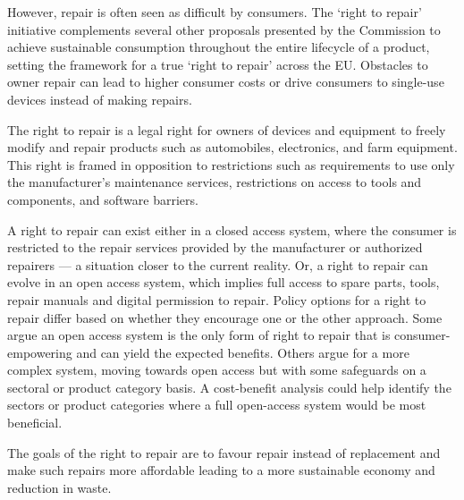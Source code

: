 However, repair is often seen as difficult by consumers. The `right to repair'
initiative complements several other proposals presented by the Commission to
achieve sustainable consumption throughout the entire lifecycle of a product,
setting the framework for a true `right to repair' across the EU. Obstacles to
owner repair can lead to higher consumer costs or drive consumers to single-use
devices instead of making repairs.

The right to repair is a legal right for owners of devices and equipment to
freely modify and repair products such as automobiles, electronics, and farm
equipment. This right is framed in opposition to restrictions such as
requirements to use only the manufacturer's maintenance services, restrictions
on access to tools and components, and software barriers.

A right to repair can exist either in a closed access system, where the
consumer is restricted to the repair services provided by the manufacturer or
authorized repairers --- a situation closer to the current reality. Or, a right
to repair can evolve in an open access system, which implies full access to
spare parts, tools, repair manuals and digital permission to repair. Policy
options for a right to repair differ based on whether they encourage one or the
other approach. Some argue an open access system is the only form of right to
repair that is consumer-empowering and can yield the expected benefits. Others
argue for a more complex system, moving towards open access but with some
safeguards on a sectoral or product category basis. A cost-benefit analysis
could help identify the sectors or product categories where a full open-access
system would be most beneficial.

The goals of the right to repair are to favour repair instead of replacement and
make such repairs more affordable leading to a more sustainable economy and
reduction in waste.


